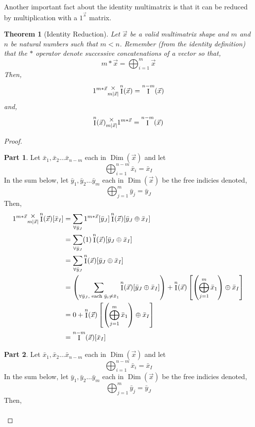\documentclass[12pt]{book}
\theoremstyle{plain}
\newtheorem{theorem}{Theorem}[chapter]
\theoremstyle{definition}
\theoremstyle{ppart}
\newtheorem{ppart}{Part}
\theoremstyle{case}
\theoremstyle{solution}
\DeclareMathOperator{\Dim}{Dim}
\DeclareMathOperator{\Ident}{I}
\newcommand{\mmult}[1]{\text{\raisebox{1ex}{$\underset{#1}{\times}$}}}
\newcommand{\shape}[1]{\left|#1\right|}
\begin{document}
Another important fact about the identity multimatrix is that it can be
reduced by multiplication with a $1^{\vec{s}}$ matrix.

\begin{theorem}[Identity Reduction]
Let $\vec{x}$ be a valid multimatrix shape and $m$ and $n$ be natural numbers
such that $m < n$.
Remember (from the identity definition) that the $*$ operator denote successive
concatenations of a vector so that,
\[ m*\vec{x} = \bigoplus_{i=1}^{m} \vec{x} \]
Then,
\[1^{m*\vec{x}} \mmult{m \shape{\vec{x}}} \Ident^n(\vec{x}) = \Ident^{n-m}(\vec{x})\]
and,
\[\Ident^n(\vec{x}) \mmult{m \shape{\vec{x}}} 1^{m*\vec{x}} = \Ident^{n-m}(\vec{x})\]
\end{theorem}
\begin{proof}
\begin{ppart}
Let $\bar{x}_1, \bar{x}_2 \ldots  \bar{x}_{n-m}$ each in $\Dim(\vec{x})$ and let
\[\bigoplus_{i = 1}^{n-m} \bar{x}_i = \bar{x}_I \]
In the sum below, let $\bar{y}_1, \bar{y}_2 \ldots \bar{y}_m$ each in $\Dim(\vec{x})$ be the
free indicies denoted,
\[\bigoplus_{j = 1}^m \bar{y}_j = \bar{y}_J \]
Then,
\begin{align*}
  1^{m*\vec{x}} \mmult{m \shape{\vec{x}}} \Ident^n(\vec{x}) [\bar{x}_I] &=
  \sum_{\forall \bar{y}_J} 1^{m*\vec{x}}[\bar{y}_J] \Ident^n(\vec{x})[\bar{y}_J \oplus \bar{x}_I] \\
  &=
  \sum_{\forall \bar{y}_J} (1) \Ident^n(\vec{x})[\bar{y}_J \oplus \bar{x}_I] \\
  &=
  \sum_{\forall \bar{y}_J} \Ident^n(\vec{x})[\bar{y}_J \oplus \bar{x}_I] \\
  &=
  \left(
    \sum_{\forall \bar{y}_J, \text{ each } \bar{y}_i \ne \bar{x}_1} \Ident^n(\vec{x})[\bar{y}_J \oplus \bar{x}_I]
  \right)
  + \Ident^n(\vec{x})\left[\left( \bigoplus_{j=1}^m \bar{x}_1 \right) \oplus \bar{x}_I\right] \\
  &= 0 + \Ident^n(\vec{x})\left[\left( \bigoplus_{j=1}^m \bar{x}_1 \right) \oplus \bar{x}_I\right] \\
  &= \Ident^{n-m}(\vec{x})[\bar{x}_I]
\end{align*}
\end{ppart}
\begin{ppart}
Let $\bar{x}_1, \bar{x}_2 \ldots \bar{x}_{n-m}$ each in $\Dim(\vec{x})$ and let
\[\bigoplus_{i = 1}^{n-m} \bar{x}_i = \bar{x}_I \]
In the sum below, let $\bar{y}_1, \bar{y}_2 \ldots \bar{y}_m$ each in $\Dim(\vec{x})$ be the
free indicies denoted,
\[\bigoplus_{j = 1}^m \bar{y}_j = \bar{y}_J \]
Then,
\begin{align*}

\end{align*}
\end{ppart}
\end{proof}
\end{document}
